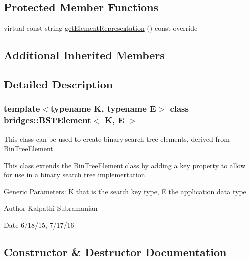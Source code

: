 \subsection*{Protected Member Functions}
\begin{DoxyCompactItemize}
\item 
virtual const string \mbox{\hyperlink{classbridges_1_1_b_s_t_element_a623d1495a0d27090dc3fc515d148f381}{get\+Element\+Representation}} () const override
\end{DoxyCompactItemize}
\subsection*{Additional Inherited Members}


\subsection{Detailed Description}
\subsubsection*{template$<$typename K, typename E$>$\newline
class bridges\+::\+B\+S\+T\+Element$<$ K, E $>$}

This class can be used to create binary search tree elements, derived from \mbox{\hyperlink{classbridges_1_1_bin_tree_element}{Bin\+Tree\+Element}}. 

This class extends the \mbox{\hyperlink{classbridges_1_1_bin_tree_element}{Bin\+Tree\+Element}} class by adding a key property to allow for use in a binary search tree implementation.

Generic Parameters\+: K that is the search key type, E the application data type

\begin{DoxyAuthor}{Author}
Kalpathi Subramanian 
\end{DoxyAuthor}
\begin{DoxyDate}{Date}
6/18/15, 7/17/16 
\end{DoxyDate}


\subsection{Constructor \& Destructor Documentation}
\mbox{\label{classbridges_1_1_b_s_t_element_aff7dbbb4011e85ea492d9a0c921895c5}} 
